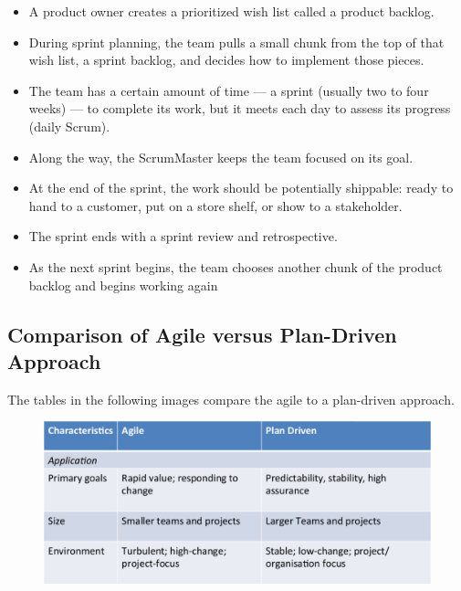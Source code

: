 \documentclass[a4paper]{article}
\begin{document}
\begin{itemize}
\item A product owner creates a prioritized wish list called a product backlog.
\item During sprint planning, the team pulls a small chunk from the top of that wish list, a sprint backlog, and decides how to implement those pieces.
\item The team has a certain amount of time — a sprint (usually two to four weeks) — to complete its work, but it meets each day to assess its progress (daily Scrum).
\item Along the way, the ScrumMaster keeps the team focused on its goal.
\item At the end of the sprint, the work should be potentially shippable: ready to hand to a customer, put on a store shelf, or show to a stakeholder.
\item The sprint ends with a sprint review and retrospective.
\item As the next sprint begins, the team chooses another chunk of the product backlog and begins working again
\end{itemize}

\subsection{Comparison of Agile versus Plan-Driven Approach}
The tables in the following images compare the agile to a plan-driven approach. 
\begin{figure}[H]
\begin{center} 
    \includegraphics[scale=0.3]{images/AgileTable1.pdf}
\end{center}
\end{figure}
\end{document}
